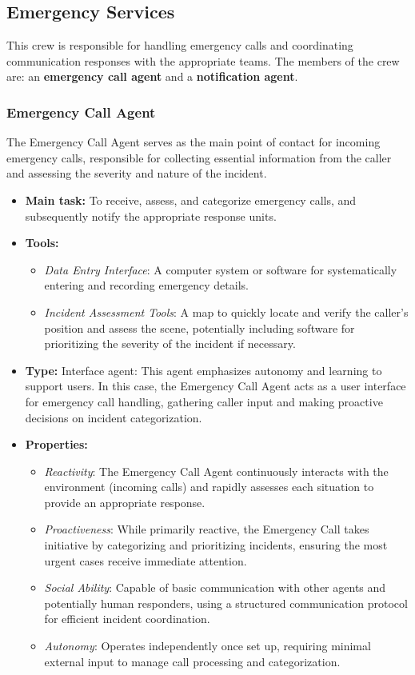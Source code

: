 \subsection{Emergency Services}

This crew is responsible for handling emergency calls and coordinating communication responses with the appropriate teams. The members of the crew are: an \textbf{emergency call agent} and a \textbf{notification agent}.

\subsubsection{Emergency Call Agent}

The Emergency Call Agent serves as the main point of contact for incoming emergency calls, responsible for collecting essential information from the caller and assessing the severity and nature of the incident.

\begin{itemize}
    \item \textbf{Main task:} To receive, assess, and categorize emergency calls, and subsequently notify the appropriate response units.
    \item \textbf{Tools:} 
    \begin{itemize}
        \item \emph{Data Entry Interface}: A computer system or software for systematically entering and recording emergency details.
        \item \emph{Incident Assessment Tools}: A map to quickly locate and verify the caller's position and assess the scene, potentially including software for prioritizing the severity of the incident if necessary.
    \end{itemize}
    \item \textbf{Type:} Interface agent: This agent emphasizes autonomy and learning to support users. In this case, the Emergency Call Agent acts as a user interface for emergency call handling, gathering caller input and making proactive decisions on incident categorization.
    \item \textbf{Properties:}
    \begin{itemize}
        \item \emph{Reactivity}:  The Emergency Call Agent continuously interacts with the environment (incoming calls) and rapidly assesses each situation to provide an appropriate response.
        \item \emph{Proactiveness}: While primarily reactive, the Emergency Call takes initiative by categorizing and prioritizing incidents, ensuring the most urgent cases receive immediate attention.
        \item \emph{Social Ability}: Capable of basic communication with other agents and potentially human responders, using a structured communication protocol for efficient incident coordination.
        \item \emph{Autonomy}: Operates independently once set up, requiring minimal external input to manage call processing and categorization.
    \end{itemize}
\end{itemize}

